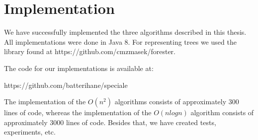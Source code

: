 \chapter{Implementation}
We have successfully implemented the three algorithms described in this thesis. All implementations were done in Java 8. For representing trees we used the library found at https://github.com/cmzmasek/forester.

The code for our implementations is available at:

https://github.com/batterihane/speciale

The implementation of the $O(n^2)$ algorithms consists of approximately 300 lines of code, whereas the implementation of the $O(nlogn)$ algorithm consists of approximately 3000 lines of code. Besides that, we have created tests, experiments, etc.


